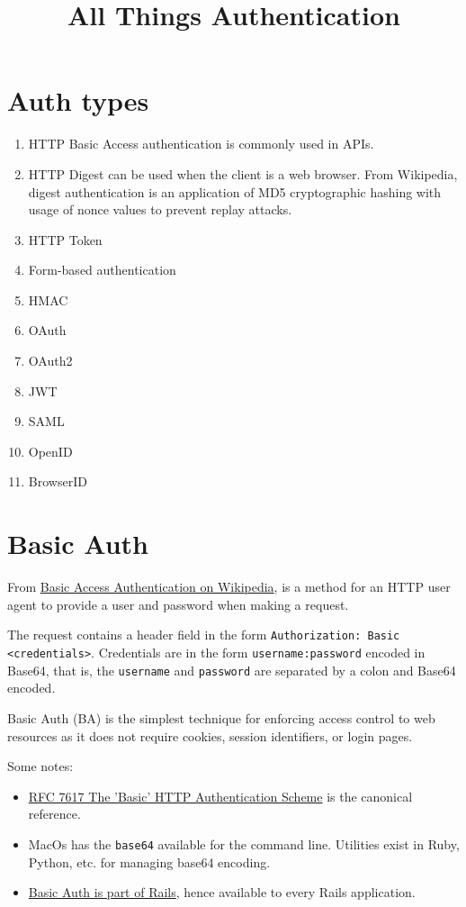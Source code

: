\documentclass{article}
\title{All Things Authentication}
\begin{document}
\maketitle

\section{Auth types}


\begin{enumerate}
  \item HTTP Basic Access authentication is commonly used in APIs.
  \item HTTP Digest can be used when the client is a web browser.
    From Wikipedia, digest authentication is an application of MD5 cryptographic
    hashing with usage of nonce values to prevent replay attacks.
  \item HTTP Token
  \item Form-based authentication
  \item HMAC
  \item OAuth
  \item OAuth2
  \item JWT
  \item SAML
  \item OpenID
  \item BrowserID
\end{enumerate}

\section{Basic Auth}

From \href{https://en.wikipedia.org/wiki/Basic_access_authentication}{%
  Basic Access Authentication on Wikipedia}, is a method for an HTTP
user agent to provide a user and password when making a request.

The request contains a header field in the form \texttt{Authorization: Basic
 <credentials>}. Credentials are in the form \texttt{username:password} encoded in
Base64, that is, the \texttt{username} and \texttt{password} are separated by a colon
and Base64 encoded.

Basic Auth (BA) is the simplest technique for enforcing access control to
web resources as it does not require cookies, session identifiers, or
login pages.

Some notes:
\begin{itemize}
  \item \href{https://tools.ietf.org/html/rfc7617}{%
      RFC 7617 The 'Basic' HTTP Authentication Scheme} is the
    canonical reference.
  \item MacOs has the \texttt{base64} available for the command line. Utilities
    exist in Ruby, Python, etc. for managing base64 encoding.
  \item \href{https://api.rubyonrails.org/classes/ActionController/HttpAuthentication/Basic.html}{%
      Basic Auth is part of Rails}, hence available to every Rails application.
\end{itemize}
\end{document}

